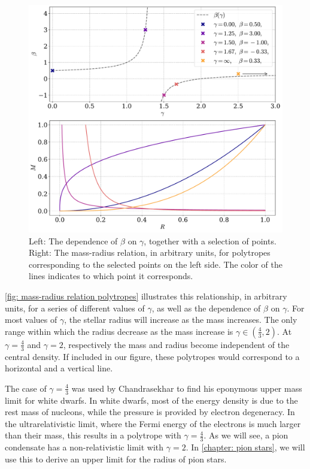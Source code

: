 \begin{figure}[h]
    \centering
    \includegraphics[width=.75\textwidth]{../scripts/figurer/mass_radius_relation_polytropes.pdf}
    \caption{
        Left: The dependence of $\beta$ on $\gamma$, together with a selection of points.
        Right: The mass-radius relation, in arbitrary units, for polytropes corresponding to the selected points on the left side. The color of the lines indicates to which point it corresponds.
        }
    \label{fig: mass-radius relation polytropes} 
\end{figure}

\autoref{fig: mass-radius relation polytropes} illustrates this relationship, in arbitrary units, for a series of different values of $\gamma$, as well as the dependence of $\beta$ on $\gamma$.
For most values of $\gamma$, the stellar radius will increase as the mass increases.
The only range within which the radius decrease as the mass increase is $\gamma \in \left(\frac{4}{3}, 2 \right)$.
At $\gamma = \frac{4}{3}$ and $\gamma = 2$, respectively the mass and radius become independent of the central density.
If included in our figure, these polytropes would correspond to a horizontal and a vertical line.

The case of $\gamma = \frac{4}{3}$ was used by Chandrasekhar to find his eponymous upper mass limit for white dwarfs.
In white dwarfs, most of the energy density is due to the rest mass of nucleons, while the pressure is provided by electron degeneracy.
In the ultrarelativistic limit, where the Fermi energy of the electrons is much larger than their mass, this results in a polytrope with $\gamma = \frac{4}{3}$.
As we will see, a pion condensate has a non-relativistic limit with $\gamma = 2$.
In \autoref{chapter: pion stars}, we will use this to derive an upper limit for the radius of pion stars.

